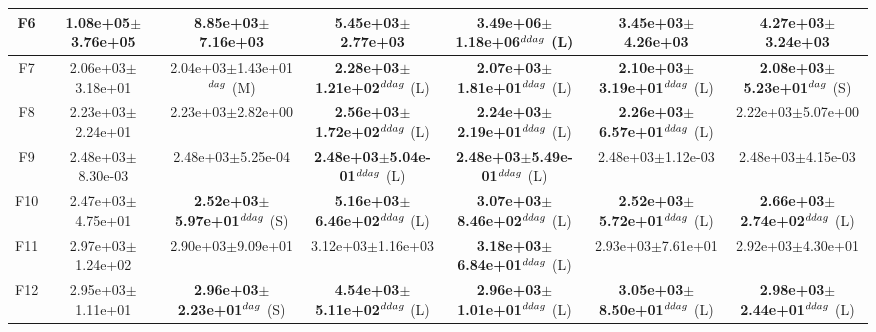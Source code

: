 \begin{table}[!t]
\begin{tabular}{c|cccccc}
F6  & 1.08e+05$\pm$3.76e+05  & 8.85e+03$\pm$7.16e+03   & 5.45e+03$\pm$2.77e+03   & \textbf{3.49e+06$\pm$1.18e+06}$^{\\ddag}$ (L)  & 3.45e+03$\pm$4.26e+03   & 4.27e+03$\pm$3.24e+03  \\ \hline
F7  & 2.06e+03$\pm$3.18e+01  & 2.04e+03$\pm$1.43e+01$^{\\dag}$ (M)  & \textbf{2.28e+03$\pm$1.21e+02}$^{\\ddag}$ (L)  & \textbf{2.07e+03$\pm$1.81e+01}$^{\\ddag}$ (L)  & \textbf{2.10e+03$\pm$3.19e+01}$^{\\ddag}$ (L)  & \textbf{2.08e+03$\pm$5.23e+01}$^{\\dag}$ (S) \\ \hline
F8  & 2.23e+03$\pm$2.24e+01  & 2.23e+03$\pm$2.82e+00   & \textbf{2.56e+03$\pm$1.72e+02}$^{\\ddag}$ (L)  & \textbf{2.24e+03$\pm$2.19e+01}$^{\\ddag}$ (L)  & \textbf{2.26e+03$\pm$6.57e+01}$^{\\ddag}$ (L)  & 2.22e+03$\pm$5.07e+00  \\ \hline
F9  & 2.48e+03$\pm$8.30e-03  & 2.48e+03$\pm$5.25e-04   & \textbf{2.48e+03$\pm$5.04e-01}$^{\\ddag}$ (L)  & \textbf{2.48e+03$\pm$5.49e-01}$^{\\ddag}$ (L)  & 2.48e+03$\pm$1.12e-03   & 2.48e+03$\pm$4.15e-03  \\ \hline
F10  & 2.47e+03$\pm$4.75e+01  & \textbf{2.52e+03$\pm$5.97e+01}$^{\\ddag}$ (S)  & \textbf{5.16e+03$\pm$6.46e+02}$^{\\ddag}$ (L)  & \textbf{3.07e+03$\pm$8.46e+02}$^{\\ddag}$ (L)  & \textbf{2.52e+03$\pm$5.72e+01}$^{\\ddag}$ (L)  & \textbf{2.66e+03$\pm$2.74e+02}$^{\\ddag}$ (L) \\ \hline
F11  & 2.97e+03$\pm$1.24e+02  & 2.90e+03$\pm$9.09e+01   & 3.12e+03$\pm$1.16e+03   & \textbf{3.18e+03$\pm$6.84e+01}$^{\\ddag}$ (L)  & 2.93e+03$\pm$7.61e+01   & 2.92e+03$\pm$4.30e+01  \\ \hline
F12  & 2.95e+03$\pm$1.11e+01  & \textbf{2.96e+03$\pm$2.23e+01}$^{\\dag}$ (S)  & \textbf{4.54e+03$\pm$5.11e+02}$^{\\ddag}$ (L)  & \textbf{2.96e+03$\pm$1.01e+01}$^{\\ddag}$ (L)  & \textbf{3.05e+03$\pm$8.50e+01}$^{\\ddag}$ (L)  & \textbf{2.98e+03$\pm$2.44e+01}$^{\\ddag}$ (L) \\ \hline
\end{tabular}
\end{table}
